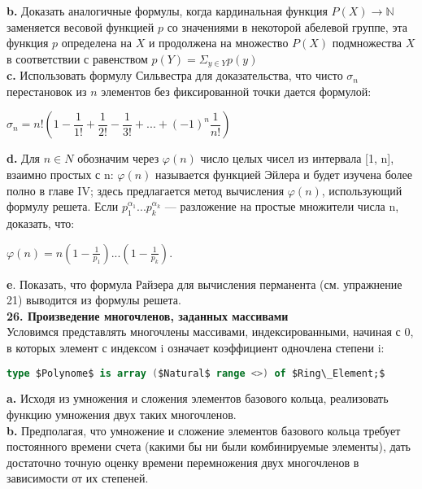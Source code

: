 \textbf{b.} Доказать аналогичные формулы, когда кардинальная функция $P(X) \rightarrow \mathbb{N}$  заменяется весовой функцией $p$ со значениями в некоторой абелевой группе, эта функция $p$ определена на $X$ и продолжена на множество $P(X)$ подмножества $X$ в соответствии с равенством $p(Y) = \Sigma_{y \in Y} p(y)$\\

\textbf{c.} Использовать формулу Сильвестра для доказательства, что чисто $\sigma_{n}$ перестановок из $n$ элементов без фиксированной точки дается\linebreak
формулой:\\
\begin{center}
$\sigma_{n} = \textit{n!} \left( 1 - \dfrac{1}{1!} + \dfrac{1}{2!} - \dfrac{1}{3!} + ... + (-1)^{\textit{n}} \dfrac{1}{\textit{n!}} \right)$
\end{center}
\newpage

\textbf{d.} Для $n \in N$ обозначим через $\varphi (n)$ число целых чисел из интервала [1, n], взаимно простых с n: $\varphi (n)$ называется функцией Эйлера и будет изучена более полно в главе IV; здесь предлагается метод вычисления $\varphi (n)$, использующий формулу решета. Если $p_{1}^{\alpha_{1}} ... p_{k}^{\alpha_{k}}$ — разложение на простые множители числа n, доказать, что:
\begin{center}
$\varphi (n) = n \left( 1 - \frac{1}{p_{1}} \right) ... \left( 1 - \frac{1}{p_{k}} \right) .$
\end{center}
\hspace*{15pt}\textbf{e}. Показать, что формула Райзера для вычисления перманента (см. упражнение 21) выводится из формулы решета.\\

\noindent
\textbf{26. Произведение многочленов, заданных массивами}\\

Условимся представлять многочлены массивами, индексированными, начиная с 0, в которых элемент с индексом i означает коэффициент одночлена степени i:
\begin{lstlisting}[mathescape=true, frame=none, language=Ada]
type $Polynome$ is array ($Natural$ range <>) of $Ring\_Element;$
\end{lstlisting}
\hspace*{15pt}\textbf{a.} Исходя из умножения и сложения элементов базового кольца, реализовать функцию умножения двух таких многочленов.\\

\textbf{b.} Предполагая, что умножение и сложение элементов базового кольца требует постоянного времени счета (какими бы ни были комбинируемые элементы), дать достаточно точную оценку времени перемножения двух многочленов в зависимости от их степеней.\\

